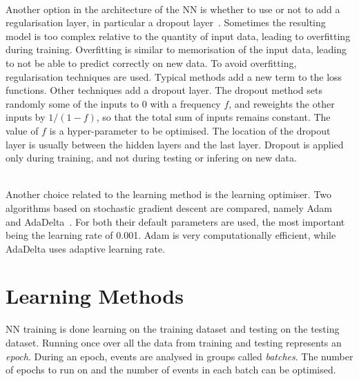 \ \\Another option in the architecture of the NN is whether to use or not to add a regularisation layer, in particular a dropout layer~\cite{DropoutLayer}. Sometimes the resulting model is too complex relative to the quantity of input data, leading to overfitting during training. Overfitting is similar to memorisation of the input data, leading to not be able to predict correctly on new data. To avoid overfitting, regularisation techniques are used. Typical methods add a new term to the loss functions. Other techniques add a dropout layer. The dropout method sets randomly some of the inputs to 0 with a frequency $f$, and reweights the other inputs by $1/(1-f)$, so that the total sum of inputs remains constant. The value of $f$ is a hyper-parameter to be optimised. The location of the dropout layer is usually between the hidden layers and the last layer. Dropout is applied only during training, and not during testing or infering on new data.

\ \\Another choice related to the learning method is the learning optimiser. Two algorithms based on stochastic gradient descent are compared, namely Adam~\cite{Adam} and AdaDelta~\cite{AdaDelta}. For both their default parameters are used, the most important being the learning rate of 0.001. Adam is very computationally efficient, while AdaDelta uses adaptive learning rate. 

\section{Learning Methods}

NN training is done learning on the training dataset and testing on the testing dataset. Running once over all the data from training and testing represents an \emph{epoch}. During an epoch, events are analysed in groups called \emph{batches}. The number of epochs to run on and the number of events in each batch can be optimised.

